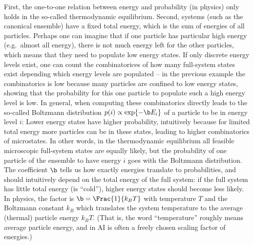 First, the one-to-one relation between energy and probability (in
physics) only holds in the so-called thermodynamic
equilibrium. Second, systems (such as the canonical ensemble) have a
fixed total energy, which is the sum of energies of all
particles. Perhaps one can imagine that if one particle has particular
high energy (e.g.\ almost all energy), there is not much energy left
for the other particles, which means that they need to populate low
energy states. If only discrete energy levels exist, one can
count the combinatorices of how many full-system states exist depending which energy levels
are populated -- in the previous example the combinatorics is low
because many particles are confined to low energy states, showing that
the probability for this one particle to populate such a high energy
level is low. In general,
when computing these combinatorics directly leads to the so-called
Boltzmann distribution $p(i) \propto \exp\lbrace-\b E_i\rbrace$ of a particle to
be in energy level $i$: Lower energy states have higher probability,
intuitively because for limited total energy more particles can be in these
states, leading to higher combinatorics of microstates. In other
words, in the thermodynamic equilibrium all feasible microscopic
full-system states are equally likely, but the probability of one
particle of the ensemble to have energy $i$ goes with the Boltzmann
distribution. The coefficient $\b$ tells us how exactly energies
translate to probabilities, and should intuitively depend on the total
energy of the full system: if the full system has little total energy
(is ``cold''), higher energy states should become less likely. In
physics, the factor is $\b=\Frac{1}{k_B T}$ with temperature $T$ and
the Boltzmann constant $k_B$ which translates the system temperature
to the average (thermal) particle energy $k_B T$. (That is,
the word ``temperature'' roughly means average particle energy, and in
AI is often a freely chosen scaling factor of energies.)



